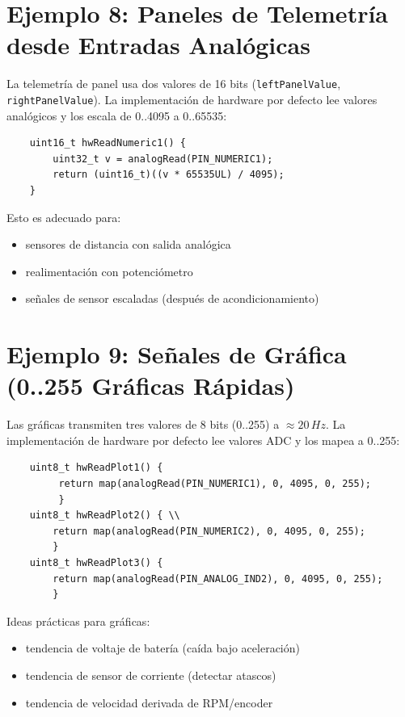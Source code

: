 \section{Ejemplo 8: Paneles de Telemetría desde Entradas Analógicas}
\label{sec:example-panels}

La telemetría de panel usa dos valores de 16 bits (\texttt{leftPanelValue}, \texttt{rightPanelValue}). La implementación de hardware
por defecto lee valores analógicos y los escala de 0..4095 a 0..65535:

\begin{verbatim}
    uint16_t hwReadNumeric1() {
        uint32_t v = analogRead(PIN_NUMERIC1);
        return (uint16_t)((v * 65535UL) / 4095);
    }
\end{verbatim}

Esto es adecuado para:
\begin{itemize}
    \item sensores de distancia con salida analógica
    \item realimentación con potenciómetro
    \item señales de sensor escaladas (después de acondicionamiento)
\end{itemize}

\section{Ejemplo 9: Señales de Gráfica (0..255 Gráficas Rápidas)}
\label{sec:example-plots}

Las gráficas transmiten tres valores de 8 bits (0..255) a \(\approx 20\,Hz\). La implementación de hardware por defecto lee
valores ADC y los mapea a 0..255:

\begin{verbatim}
    uint8_t hwReadPlot1() {
         return map(analogRead(PIN_NUMERIC1), 0, 4095, 0, 255);
         }
    uint8_t hwReadPlot2() { \\
        return map(analogRead(PIN_NUMERIC2), 0, 4095, 0, 255);
        }
    uint8_t hwReadPlot3() {
        return map(analogRead(PIN_ANALOG_IND2), 0, 4095, 0, 255);
        }
\end{verbatim}

\noindent Ideas prácticas para gráficas:
\begin{itemize}
    \item tendencia de voltaje de batería (caída bajo aceleración)
    \item tendencia de sensor de corriente (detectar atascos)
    \item tendencia de velocidad derivada de RPM/encoder
\end{itemize}

